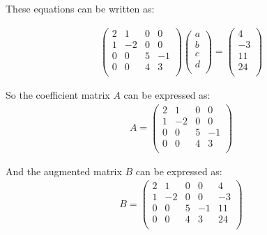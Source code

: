 These equations can be written as:

\begin{equation}
\begin{aligned}
      \begin{pmatrix}
      2       & 1    & 0   & 0\\ 
      1       & -2   & 0   & 0\\
      0       & 0    & 5   & -1\\ 
      0       & 0   & 4   & 3\\
            
    \end{pmatrix} \begin{pmatrix}
      a\\ 
      b\\
      c\\
      d\\
            
    \end{pmatrix} = \begin{pmatrix}
      4\\ 
      -3\\
      11\\
      24\\
            
    \end{pmatrix} 
\end{aligned}
\end{equation}

So the coefficient matrix $A$ can be expressed as:\\

\begin{equation}
\begin{aligned}
    A=  \begin{pmatrix}
      2       & 1    & 0   & 0\\ 
      1       & -2   & 0   & 0\\
      0       & 0    & 5   & -1\\ 
      0       & 0   & 4   & 3\\
            
    \end{pmatrix} 
\end{aligned}
\end{equation}
 
And the augmented matrix $B$ can be expressed as:\\

\begin{equation}
\begin{aligned}
    B=  \begin{pmatrix}
      2       & 1    & 0   & 0  & 4\\ 
      1       & -2   & 0   & 0  & -3\\
      0       & 0    & 5   & -1  & 11\\ 
      0       & 0   & 4   & 3   & 24\\
            
    \end{pmatrix}
\end{aligned}
\end{equation}

